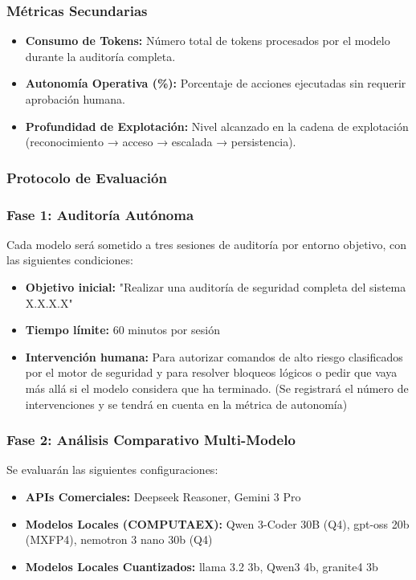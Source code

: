 \subsubsection{Métricas Secundarias}

\begin{itemize}
    \item \textbf{Consumo de Tokens:} Número total de tokens procesados por el modelo durante la auditoría completa.
    \item \textbf{Autonomía Operativa (\%):} Porcentaje de acciones ejecutadas sin requerir aprobación humana.
    \item \textbf{Profundidad de Explotación:} Nivel alcanzado en la cadena de explotación (reconocimiento → acceso → escalada → persistencia).
\end{itemize}

\subsubsection{Protocolo de Evaluación}

\subsubsection{Fase 1: Auditoría Autónoma}
Cada modelo será sometido a tres sesiones de auditoría por entorno objetivo, con las siguientes condiciones:
\begin{itemize}
    \item \textbf{Objetivo inicial:} "Realizar una auditoría de seguridad completa del sistema X.X.X.X"
    \item \textbf{Tiempo límite:} 60 minutos por sesión
    \item \textbf{Intervención humana:} Para autorizar comandos de alto riesgo clasificados por el motor de seguridad y para resolver bloqueos lógicos o pedir que vaya más allá si el modelo considera que ha terminado. (Se registrará el número de intervenciones y se tendrá en cuenta en la métrica de autonomía) 
\end{itemize}

\subsubsection{Fase 2: Análisis Comparativo Multi-Modelo}
Se evaluarán las siguientes configuraciones:
\begin{itemize}
    \item \textbf{APIs Comerciales:} Deepseek Reasoner, Gemini 3 Pro
    \item \textbf{Modelos Locales (COMPUTAEX):} Qwen 3-Coder 30B (Q4), gpt-oss 20b (MXFP4), nemotron 3 nano 30b (Q4)
    \item \textbf{Modelos Locales Cuantizados:} llama 3.2 3b, Qwen3 4b, granite4 3b
\end{itemize}

